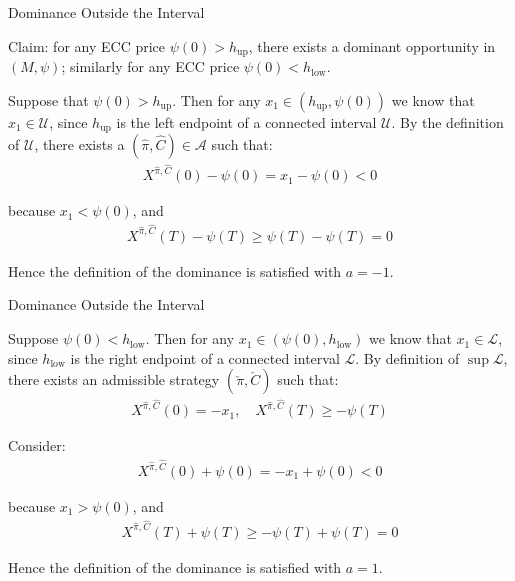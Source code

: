 \documentclass{beamer}
\begin{document}
\begin{frame}{Dominance Outside the Interval}

    {\footnotesize \footnotesize
    \par  Claim: for any ECC price $\psi(0) > h_{\text{up}}$, 
    there exists a dominant opportunity in $(M, \psi)$; similarly for any ECC price $\psi(0) < h_{\text{low}}$.
    \vspace{1em}
    \par Suppose that $\psi(0) > h_{\text{up}}$. Then for any $x_1 \in (h_{\text{up}}, \psi(0))$ we know that $x_1 \in \mathcal{U}$, since $h_{\text{up}}$ is 
    the left endpoint of a connected interval $\mathcal{U}$. By the definition of $\mathcal{U}$, there exists 
    a $(\hat{\pi}, \hat{C}) \in \mathcal{A}$ such that:
     \pause 
    \begin{align*}
        X^{\hat{\pi}, \hat{C}}(0) - \psi(0) = x_1 - \psi(0) < 0
    \end{align*}
    \par because $x_1 < \psi(0)$, and
    \begin{align*}
        X^{\hat{\pi}, \hat{C}}(T) - \psi(T) \geq \psi(T) - \psi(T) = 0
    \end{align*}
    \par Hence the definition of the dominance is satisfied with $a = -1$. 
    }
\end{frame} 

\begin{frame}{Dominance Outside the Interval}

    {\footnotesize \footnotesize
    \par  Suppose $\psi(0) < h_{\text{low}}$. Then for any $x_1 \in (\psi(0),h_{\text{low}})$ we 
    know that $x_1 \in \mathcal{L}$, since $h_{\text{low}}$ is 
    the right endpoint of a connected interval $\mathcal{L}$. By definition of $\sup \mathcal{L}$, 
     there exists an admissible strategy $(\check{\pi}, \check{C})$ such that: 
     \begin{align*}
         X^{\hat{\pi}, \hat{C}}(0) = -x_1, \quad X^{\hat{\pi}, \hat{C}}(T) \geq -\psi(T)
     \end{align*}
     \par  \pause Consider: 
     \begin{align*}
         X^{\hat{\pi}, \hat{C}}(0) + \psi(0) = -x_1 + \psi(0) < 0
     \end{align*}
     \par because $x_1 > \psi(0)$, and
     \begin{align*}
        X^{\hat{\pi}, \hat{C}}(T) + \psi(T) \geq -\psi(T) + \psi(T) = 0
    \end{align*}
    \par Hence the definition of the dominance is satisfied with $a = 1$. 
    }
\end{frame} 
\end{document}
